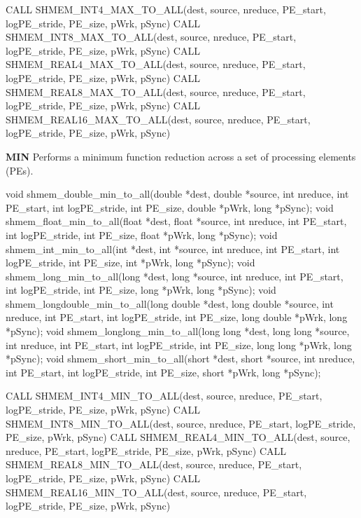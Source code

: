 \synF %

CALL SHMEM_INT4_MAX_TO_ALL(dest, source, nreduce, PE_start, logPE_stride, PE_size, pWrk, pSync)
CALL SHMEM_INT8_MAX_TO_ALL(dest, source, nreduce, PE_start, logPE_stride, PE_size, pWrk, pSync)
CALL SHMEM_REAL4_MAX_TO_ALL(dest, source, nreduce, PE_start, logPE_stride, PE_size, pWrk, pSync)
CALL SHMEM_REAL8_MAX_TO_ALL(dest, source, nreduce, PE_start, logPE_stride, PE_size, pWrk, pSync)
CALL SHMEM_REAL16_MAX_TO_ALL(dest, source, nreduce, PE_start, logPE_stride, PE_size, pWrk, pSync)

\bigskip
\textbf{MIN} \newline
Performs a minimum function reduction across a set of processing elements (\ac{PE}s).\newline
\synC %

void shmem_double_min_to_all(double *dest, double *source, int nreduce, int PE_start, int logPE_stride, int PE_size, double *pWrk, long *pSync);
void shmem_float_min_to_all(float *dest, float *source, int nreduce, int PE_start, int logPE_stride, int PE_size, float *pWrk, long *pSync);
void shmem_int_min_to_all(int *dest, int *source, int nreduce, int PE_start, int logPE_stride, int PE_size, int *pWrk, long *pSync);
void shmem_long_min_to_all(long *dest, long *source, int nreduce, int PE_start, int logPE_stride, int PE_size, long *pWrk, long *pSync);
void shmem_longdouble_min_to_all(long double *dest, long double *source, int nreduce, int PE_start, int logPE_stride, int PE_size, long double *pWrk, long *pSync);
void shmem_longlong_min_to_all(long long *dest, long long *source, int nreduce, int PE_start, int logPE_stride, int PE_size, long long *pWrk, long *pSync);
void shmem_short_min_to_all(short *dest, short *source, int nreduce, int PE_start, int logPE_stride, int PE_size, short *pWrk, long *pSync);
\synF %

CALL SHMEM_INT4_MIN_TO_ALL(dest, source, nreduce, PE_start, logPE_stride, PE_size, pWrk, pSync)
CALL SHMEM_INT8_MIN_TO_ALL(dest, source, nreduce, PE_start, logPE_stride, PE_size, pWrk, pSync)
CALL SHMEM_REAL4_MIN_TO_ALL(dest, source, nreduce, PE_start, logPE_stride, PE_size, pWrk, pSync)
CALL SHMEM_REAL8_MIN_TO_ALL(dest, source, nreduce, PE_start, logPE_stride, PE_size, pWrk, pSync)
CALL SHMEM_REAL16_MIN_TO_ALL(dest, source, nreduce, PE_start, logPE_stride, PE_size, pWrk, pSync)

